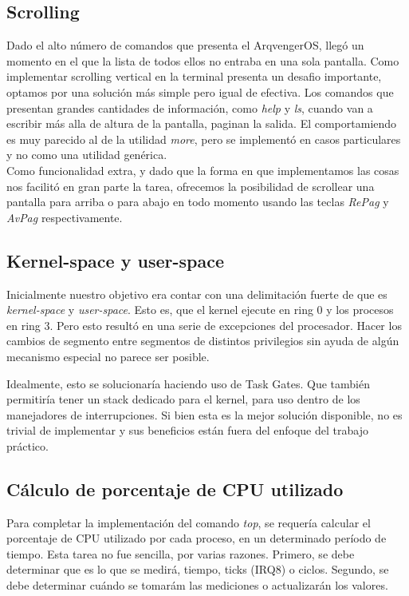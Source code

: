 \documentclass[a4paper,10pt]{article}
\begin{document}
        \subsection{Scrolling}
        Dado el alto número de comandos que presenta el ArqvengerOS, llegó un momento en el que la lista de todos ellos no entraba en una sola pantalla.
        Como implementar scrolling vertical en la terminal presenta un desafio importante, optamos por una solución más simple pero igual de efectiva.
        Los comandos que presentan grandes cantidades de información, como \textit{help} y \textit{ls}, cuando van a escribir más alla de altura de la pantalla, 
        paginan la salida.
        El comportamiendo es muy parecido al de la utilidad \textit{more}, pero se implementó en casos particulares y no como una utilidad genérica. \\


        Como funcionalidad extra, y dado que la forma en que implementamos las cosas nos facilitó en gran parte la tarea, ofrecemos la posibilidad de scrollear una 
        pantalla para arriba o para abajo en todo momento usando las teclas \textit{RePag} y \textit{AvPag} respectivamente.


        \subsection{Kernel-space y user-space}
        Inicialmente nuestro objetivo era contar con una delimitación fuerte de que es \textit{kernel-space} y \textit{user-space}.
        Esto es, que el kernel ejecute en ring 0 y los procesos en ring 3.
        Pero esto resultó en una serie de excepciones del procesador.
        Hacer los cambios de segmento entre segmentos de distintos privilegios sin ayuda de algún mecanismo especial no parece ser posible.

        Idealmente, esto se solucionaría haciendo uso de Task Gates.
        Que también permitiría tener un stack dedicado para el kernel, para uso dentro de los manejadores de interrupciones.
        Si bien esta es la mejor solución disponible, no es trivial de implementar y sus beneficios están fuera del enfoque del trabajo práctico.

        \subsection{Cálculo de porcentaje de CPU utilizado}
        Para completar la implementación del comando \textit{top}, se requería calcular el porcentaje de CPU utilizado por cada proceso, en un determinado
        período de tiempo. Esta tarea no fue sencilla, por varias razones. Primero, se debe determinar que es lo que se medirá, tiempo, ticks (IRQ8) o ciclos. 
        Segundo, se debe determinar cuándo se tomarám las mediciones o actualizarán los valores. 
\end{document}
